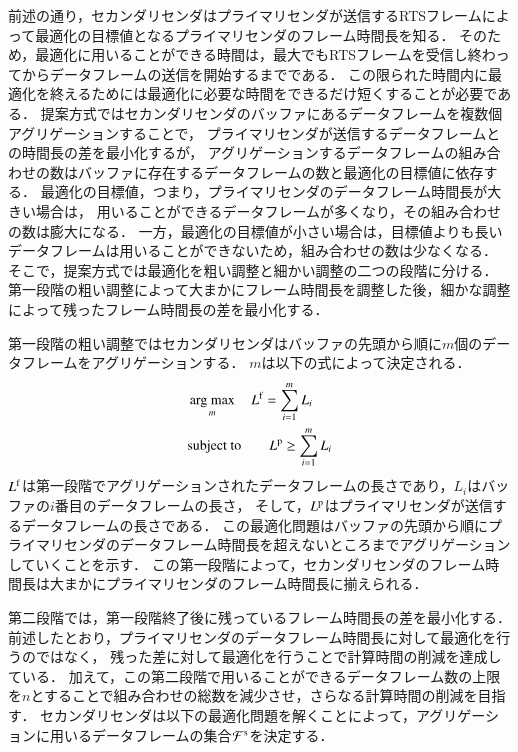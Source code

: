 \documentclass[master]{kuisthesis}		%
\newcommand{\argmax}{\mathop{\rm arg~max}\limits}
\begin{document}
		前述の通り，セカンダリセンダはプライマリセンダが送信するRTSフレームによって最適化の目標値となるプライマリセンダのフレーム時間長を知る．
		そのため，最適化に用いることができる時間は，最大でもRTSフレームを受信し終わってからデータフレームの送信を開始するまでである．
		この限られた時間内に最適化を終えるためには最適化に必要な時間をできるだけ短くすることが必要である．
		提案方式ではセカンダリセンダのバッファにあるデータフレームを複数個アグリゲーションすることで，
		プライマリセンダが送信するデータフレームとの時間長の差を最小化するが，
		アグリゲーションするデータフレームの組み合わせの数はバッファに存在するデータフレームの数と最適化の目標値に依存する．
		最適化の目標値，つまり，プライマリセンダのデータフレーム時間長が大きい場合は，
		用いることができるデータフレームが多くなり，その組み合わせの数は膨大になる．
		一方，最適化の目標値が小さい場合は，目標値よりも長いデータフレームは用いることができないため，組み合わせの数は少なくなる．
		そこで，提案方式では最適化を粗い調整と細かい調整の二つの段階に分ける．
		第一段階の粗い調整によって大まかにフレーム時間長を調整した後，細かな調整によって残ったフレーム時間長の差を最小化する．
		\par
		第一段階の粗い調整ではセカンダリセンダはバッファの先頭から順に$m$個のデータフレームをアグリゲーションする．
		$m$は以下の式によって決定される．
		\begin{align}
			&\argmax_m\quad L^{\rm f} = \sum_{i = 1}^{m} L_i \\
			&{\rm subject \ to} \qquad  L^{\rm p} \geq \sum_{i = 1}^{m} L_i
		\end{align}
		$L^{\rm f}$は第一段階でアグリゲーションされたデータフレームの長さであり，$L_i$はバッファの$i$番目のデータフレームの長さ，
		そして，$L^{\rm p}$はプライマリセンダが送信するデータフレームの長さである．
		この最適化問題はバッファの先頭から順にプライマリセンダのデータフレーム時間長を超えないところまでアグリゲーションしていくことを示す．
		この第一段階によって，セカンダリセンダのフレーム時間長は大まかにプライマリセンダのフレーム時間長に揃えられる．
		\par
		第二段階では，第一段階終了後に残っているフレーム時間長の差を最小化する．
		前述したとおり，プライマリセンダのデータフレーム時間長に対して最適化を行うのではなく，
		残った差に対して最適化を行うことで計算時間の削減を達成している．
		加えて，この第二段階で用いることができるデータフレーム数の上限を$n$とすることで組み合わせの総数を減少させ，さらなる計算時間の削減を目指す．
		セカンダリセンダは以下の最適化問題を解くことによって，アグリゲーションに用いるデータフレームの集合${\mathcal F}^{\rm s}$を決定する．
\end{document}
